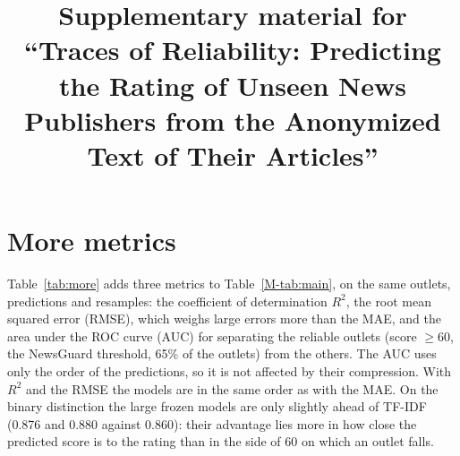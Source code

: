 \documentclass[11pt,a4paper]{article}
\title{Supplementary material for ``Traces of Reliability: Predicting the Rating of Unseen News Publishers from the
Anonymized Text of Their Articles''}
\author{}
\date{}
\begin{document}
\maketitle



\section{More metrics}\label{app:measures}
Table~\ref{tab:more} adds three metrics to Table~\ref{M-tab:main}, on the same outlets, predictions and resamples: the
coefficient of determination $R^2$, the root mean squared error (RMSE), which weighs large errors more than the MAE, and
the area under the ROC curve (AUC) for separating the reliable outlets (score $\geq 60$, the NewsGuard threshold, 65\% of
the outlets) from the others. The AUC uses only the order of the predictions, so it is not affected by their
compression. With $R^2$ and the RMSE the models are in the same order as with the MAE. On the binary distinction the
large frozen models are only slightly ahead of TF-IDF (0.876 and 0.880 against 0.860): their advantage lies more in how
close the predicted score is to the rating than in the side of 60 on which an outlet falls.

\begin{table}[h]
\centering
\caption{More metrics per outlet. Each row is a model, as in Table~\ref{M-tab:main}; brackets give 95\% bootstrap
intervals. Higher $R^2$ and AUC and lower RMSE are better.}\label{tab:more}
\end{table}
\end{document}

